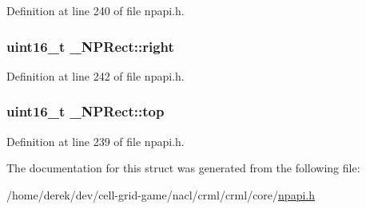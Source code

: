 Definition at line 240 of file npapi.h.

\hypertarget{struct___n_p_rect_aef857a950aa142671e4b70a0376cd521}{
\subsubsection[{right}]{\setlength{\rightskip}{0pt plus 5cm}uint16\_\-t {\bf \_\-NPRect::right}}}
\label{struct___n_p_rect_aef857a950aa142671e4b70a0376cd521}


Definition at line 242 of file npapi.h.

\hypertarget{struct___n_p_rect_af26bc130dfcbdf146f088c83a3d086d9}{
\subsubsection[{top}]{\setlength{\rightskip}{0pt plus 5cm}uint16\_\-t {\bf \_\-NPRect::top}}}
\label{struct___n_p_rect_af26bc130dfcbdf146f088c83a3d086d9}


Definition at line 239 of file npapi.h.



The documentation for this struct was generated from the following file:\begin{DoxyCompactItemize}
\item 
/home/derek/dev/cell-\/grid-\/game/nacl/crml/crml/core/\hyperlink{npapi_8h}{npapi.h}\end{DoxyCompactItemize}
